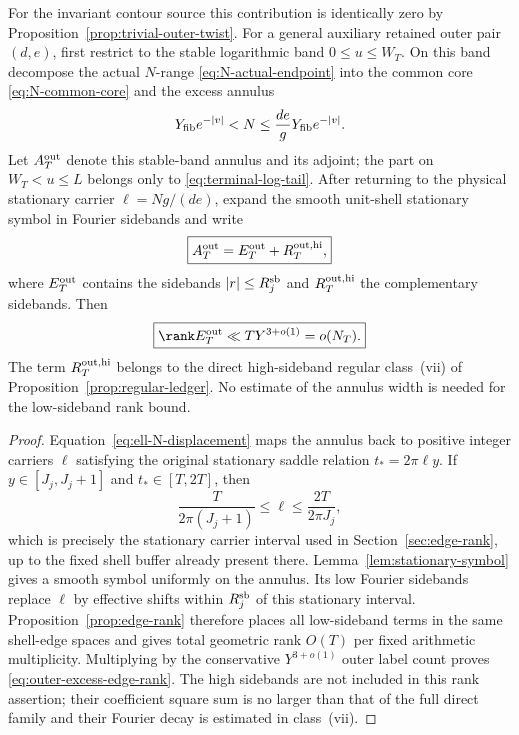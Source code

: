 \begin{proposition}
\label{prop:outer-excess-edge}
For the invariant contour source this contribution is identically zero by
Proposition~\ref{prop:trivial-outer-twist}. For a general auxiliary retained
outer pair $(d,e)$, first restrict to the stable logarithmic
band $0\le u\le W_T$. On this band decompose the actual $N$-range
\eqref{eq:N-actual-endpoint} into the common core \eqref{eq:N-common-core} and
the excess annulus
\begin{equation}
Y_{\rm fib}e^{-|v|}<N
\le \frac{de}{g}Y_{\rm fib}e^{-|v|}.
\label{eq:outer-excess-annulus}
\end{equation}
Let $A_T^{\rm out}$ denote this stable-band annulus and its adjoint; the part on
$W_T<u\le L$ belongs only to \eqref{eq:terminal-log-tail}. After returning to
the physical stationary carrier $\ell=Ng/(de)$, expand the smooth unit-shell
stationary symbol in Fourier sidebands and write
\begin{equation}
\boxed{A_T^{\rm out}=E_T^{\rm out}+R_T^{\rm out,hi},}
\label{eq:outer-excess-sideband-split}
\end{equation}
where $E_T^{\rm out}$ contains the sidebands
$|r|\le R_j^{\rm sb}$ and $R_T^{\rm out,hi}$ the complementary sidebands.
Then
\begin{equation}
\boxed{
\rank E_T^{\rm out}
\ll T Y^{3+o(1)}=o(N_T).
}
\label{eq:outer-excess-edge-rank}
\end{equation}
The term $R_T^{\rm out,hi}$ belongs to the direct high-sideband regular
class~(vii) of Proposition~\ref{prop:regular-ledger}. No estimate of the annulus
width is needed for the low-sideband rank bound.
\end{proposition}

\begin{proof}
Equation~\eqref{eq:ell-N-displacement} maps the annulus back to positive integer
carriers $\ell$ satisfying the original stationary saddle relation
$t_*=2\pi\ell y$. If $y\in[J_j,J_j+1]$ and $t_*\in[T,2T]$, then
\[
\frac{T}{2\pi(J_j+1)}\le \ell\le \frac{2T}{2\pi J_j},
\]
which is precisely the stationary carrier interval used in
Section~\ref{sec:edge-rank}, up to the fixed shell buffer already present there.
Lemma~\ref{lem:stationary-symbol} gives a smooth symbol uniformly on the
annulus. Its low Fourier sidebands replace $\ell$ by effective shifts within
$R_j^{\rm sb}$ of this stationary interval. Proposition~\ref{prop:edge-rank}
therefore places all low-sideband terms in the same shell-edge spaces and gives
total geometric rank $O(T)$ per fixed arithmetic multiplicity. Multiplying by
the conservative $Y^{3+o(1)}$ outer label count proves
\eqref{eq:outer-excess-edge-rank}. The high sidebands are not included in this
rank assertion; their coefficient square sum is no larger than that of the full
direct family and their Fourier decay is estimated in class~(vii).
\end{proof}

